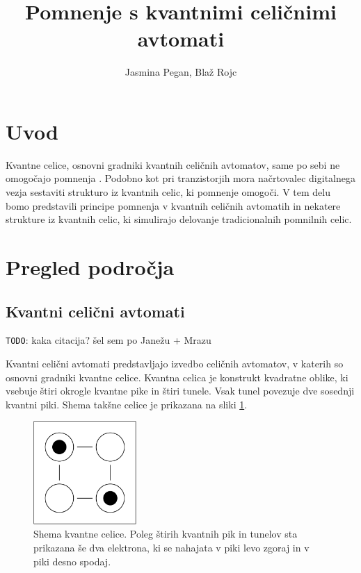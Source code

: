 \documentclass[a4paper, 11pt]{article}
\title{Pomnenje s kvantnimi celičnimi avtomati}
\author{Jasmina Pegan, Blaž Rojc}
\newcommand{\todo}{\textcolor{BrickRed}{\texttt{TODO}}} %
\begin{document}
\maketitle

\renewcommand{\figurename}{Slika} %

\section{Uvod}

Kvantne celice, osnovni gradniki kvantnih celičnih avtomatov, same po sebi ne omogočajo pomnenja \cite{janez_phd}.
Podobno kot pri tranzistorjih mora načrtovalec digitalnega vezja sestaviti strukturo iz kvantnih celic, ki pomnenje omogoči.
V tem delu bomo predstavili principe pomnenja v kvantnih celičnih avtomatih in nekatere strukture iz kvantnih celic, ki simulirajo delovanje tradicionalnih pomnilnih celic.



\section{Pregled področja}

\subsection{Kvantni celični avtomati}

\todo: kaka citacija? šel sem po Janežu + Mrazu

Kvantni celični avtomati predstavljajo izvedbo celičnih avtomatov, v katerih so osnovni gradniki kvantne celice.
Kvantna celica je konstrukt kvadratne oblike, ki vsebuje štiri okrogle kvantne pike in štiri tunele.
Vsak tunel povezuje dve sosednji kvantni piki.
Shema takšne celice je prikazana na sliki \ref{img-pregled-single-cell}.

\begin{figure}[h]
	\centering
	\includegraphics[width=0.35\textwidth]{../img/pregled/single_cell.pdf}
	\caption{Shema kvantne celice. Poleg štirih kvantnih pik in tunelov sta prikazana še dva elektrona, ki se nahajata v piki levo zgoraj in v piki desno spodaj.}
	\label{img-pregled-single-cell}
\end{figure}
\end{document}
